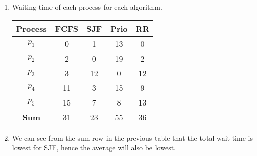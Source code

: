 \documentclass[a4paper,11pt]{article}
\begin{document}
\begin{enumerate}[label=\alph*.]
    \item Waiting time of each process for each algorithm.
    \begin{table}[h]
        \begin{center}
            \begin{tabular}{c|c|c|c|c}
                \textbf{Process} & \textbf{FCFS} & \textbf{SJF} & \textbf{Prio} & \textbf{RR}\\
                \hline
                $p_1$   &   0    &   1    &   13   &   0\\
                $p_2$   &   2    &   0    &   19   &   2\\
                $p_3$   &   3    &   12   &   0    &   12\\
                $p_4$   &   11   &   3    &   15   &   9\\
                $p_5$   &   15   &   7    &   8    &   13\\
                \hline
                \textbf{Sum} & 31 & 23 & 55 & 36\\
            \end{tabular}
            \label{tab:table4}
        \end{center}
    \end{table}
    \item We can see from the sum row in the previous table that the total wait time is lowest for SJF, hence the average will also be lowest.
\end{enumerate}
\end{document}
